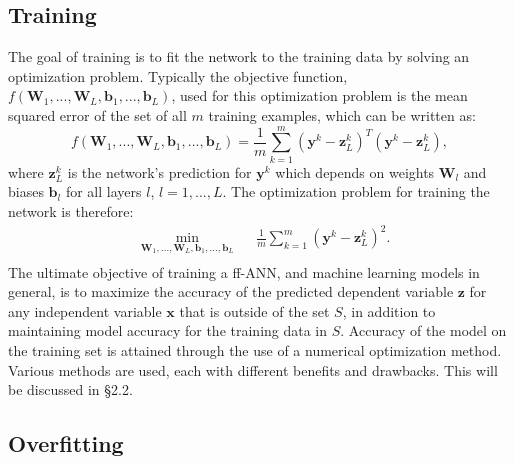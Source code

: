 \documentclass[letterpaper,12pt,titlepage,oneside,final]{book}
\begin{document}
	
	\subsection{Training}
	
	The goal of training is to fit the network to the training data by solving an optimization problem. Typically the objective function, $f(\mathbf{W}_{1},...,\mathbf{W}_{L},\mathbf{b}_{1},...,\mathbf{b}_{L})$, used for this optimization problem is the mean squared error of the set of all $m$ training examples, which can be written as: 
	\begin{equation}
	f(\mathbf{W}_{1},...,\mathbf{W}_{L},\mathbf{b}_{1},...,\mathbf{b}_{L}) = \frac{1}{m}\sum_{k=1}^{m}{(\mathbf{y}^{k} - \mathbf{z}_{L}^{k})^{T}(\mathbf{y}^{k} - \mathbf{z}_{L}^{k})},
	\label{equation:objective_function}
	\end{equation}
	where $\mathbf{z}_{L}^{k}$ is the network's prediction for $\mathbf{y}^{k}$ which depends on weights $\mathbf{W}_{l}$ and biases $\mathbf{b}_{l}$ for all layers $l$, $l=1,...,L$. The optimization problem for training the network is therefore:
	\begin{equation}
	\begin{aligned}
	& \underset{\mathbf{W}_{1},...,\mathbf{W}_{L},\mathbf{b}_{1},...,\mathbf{b}_{L}}{\text{min}}
	& & \frac{1}{m}\sum_{k=1}^{m}{(\mathbf{y}^{k} - \mathbf{z}_{L}^{k})^{2}}.\\
	\end{aligned}
	\label{equation:optimization}
	\end{equation}
	The ultimate objective of training a ff-ANN, and machine learning models in general, is to maximize the accuracy of the predicted dependent variable $\mathbf{z}$ for any independent variable $\mathbf{x}$ that is outside of the set $S$, in addition to maintaining model accuracy for the training data in $S$. Accuracy of the model on the training set is attained through the use of a numerical optimization method. Various methods are used, each with different benefits and drawbacks. This will be discussed in \S{2.2}.
	
	\subsection{Overfitting}
	
\end{document}
